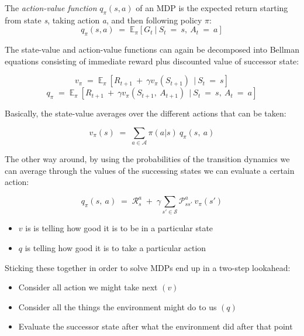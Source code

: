 \documentclass[10pt]{article}
\begin{document}
The \textit{action-value function} $q_{\pi}(s, a)$ of an MDP is the expected return starting from state \textit{s}, taking action \textit{a}, and then following policy $\pi$:
\begin{equation}
q_{\pi}(s,a) \; = \; \mathbb{E}_{\pi} [ G_{t} \: | \: S_{t} \: = \: s, \: A_{t} \: = \: a] 
\end{equation}

The state-value and action-value functions can again be decomposed into Bellman equations consisting of immediate reward plus discounted value of successor state:

\begin{equation}
v_{\pi} \; = \; \mathbb{E}_{\pi} \:[ R_{t+1} \: + \: \gamma v_{\pi} (S_{t+1}) \: \ | \: S_{t} \: = \: s]
\end{equation}
\begin{equation}
q_{\pi} \; = \; \mathbb{E}_{\pi} \:[ R_{t+1} \: + \: \gamma v_{\pi} (S_{t+1}, \: A_{t+1}) \: \ | \: S_{t} \: = \: s, \: A_{t} \: = \: a]
\end{equation}

Basically, the state-value averages over the different actions that can be taken:

\begin{equation}
v_{\pi}(s) \; = \; \sum_{a \in \mathcal{A}} \pi(a|s)\:q_{\pi}(s,\:a)
\end{equation}

The other way around, by using the probabilities of the transition dynamics we can average through the values of the successing states we can evaluate a certain action:

\begin{equation}
q_{\pi}(s,\:a)\;=\;\mathcal{R}_{s}^{a}\;+\;\gamma \sum_{s' \in \mathcal{S}} \mathcal{P}_{ss'}^{a}\:v_{\pi}(s')
\label{eq:qn_avg}
\end{equation}

\begin{itemize}
\item $v$ is is telling how good it is to be in a particular state
\item $q$ is telling how good it is to take a particular action
\end{itemize}


Sticking these together in order to solve MDPs end up in a two-step lookahead:
\begin{itemize}
\item Consider all action we might take next $(v)$
\item Consider all the things the environment might do to us $(q)$
\item Evaluate the successor state after what the environment did after that point
\end{itemize}
\end{document}
